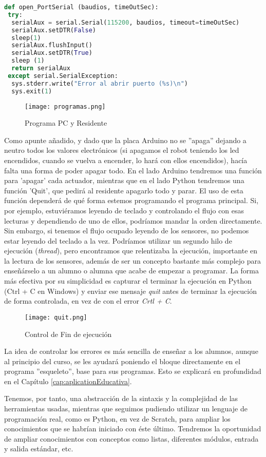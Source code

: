 \begin{lstlisting}[language=python]	
def open_PortSerial (baudios, timeOutSec):
 try:
  serialAux = serial.Serial(115200, baudios, timeout=timeOutSec)
  serialAux.setDTR(False)
  sleep(1)
  serialAux.flushInput()
  serialAux.setDTR(True)
  sleep (1)
  return serialAux
 except serial.SerialException:
  sys.stderr.write("Error al abrir puerto (%s)\n")
  sys.exit(1)
\end{lstlisting}
\begin{figure}[h]
	\centering
	\texttt{[image: programas.png]}
	\label{img:Mix}
	\caption{Programa PC y Residente}
\end{figure} 
\par Como apunte añadido, y dado que la placa Arduino no se ''apaga'' dejando a neutro todos los valores electrónicos (si apagamos el robot teniendo los led encendidos, cuando se vuelva a encender, lo hará con ellos encendidos), hacía falta una forma de poder apagar todo. En el lado Arduino tendremos una función para 'apagar' cada actuador, mientras que en el lado Python tendremos una función 'Quit', que pedirá al residente apagarlo todo y parar. El uso de esta función dependerá de qué forma estemos programando el programa principal. Si, por ejemplo, estuviéramos leyendo de teclado y controlando el flujo con esas lecturas y dependiendo de uno de ellos, podríamos mandar la orden directamente. Sin embargo, si tenemos el flujo ocupado leyendo de los sensores, no podemos estar leyendo del teclado a la vez. Podríamos utilizar un segundo hilo de ejecución (\textit{thread}), pero encontramos que relentizaba la ejecución, importante en la lectura de los sensores, además de ser un concepto bastante más complejo para enseñárselo a un alumno o alumna que acabe de empezar a programar. La forma más efectiva por su simplicidad es capturar el terminar la ejecución en Python (Ctrl + C en Windows) y enviar ese mensaje \textit{quit} antes de terminar la ejecución de forma controlada, en vez de con el error \textit{Crtl + C}. \\

\newpage
\begin{figure}[h]
	\centering
	\texttt{[image: quit.png]}
	\label{img:CrtlC}
	\caption{Control de Fin de ejecución}
\end{figure} 

La idea de controlar los errores es más sencilla de enseñar a los alumnos, aunque al principio del curso, se les ayudará poniendo el bloque directamente en el programa ''esqueleto'', base para sus programas. Esto se explicará en profundidad en el Capítulo \ref{cap:aplicationEducativa}.
\vspace{1cm}
\par Tenemos, por tanto, una abstracción de la sintaxis y la complejidad de las herramientas usadas, mientras que seguimos pudiendo utilizar un lenguaje de programación real, como es Python, en vez de Scratch, para ampliar los conocimientos que se habrían iniciado con éste último. Tendremos la oportunidad de ampliar conocimientos con conceptos como listas, diferentes módulos, entrada y salida estándar, etc. 